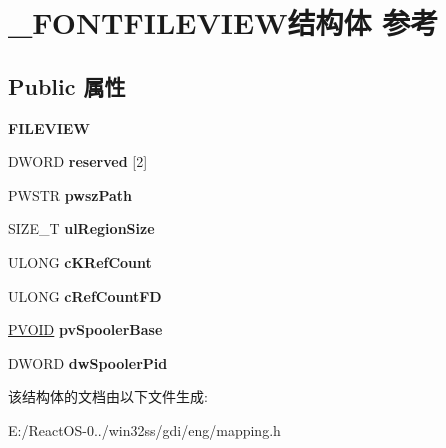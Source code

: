 \hypertarget{struct___f_o_n_t_f_i_l_e_v_i_e_w}{}\section{\+\_\+\+F\+O\+N\+T\+F\+I\+L\+E\+V\+I\+E\+W结构体 参考}
\label{struct___f_o_n_t_f_i_l_e_v_i_e_w}
\subsection*{Public 属性}
\begin{DoxyCompactItemize}
\item 
\mbox{\label{struct___f_o_n_t_f_i_l_e_v_i_e_w_ad887c3b9ffa9a83d175cf43e0cae3d38}} 
{\bfseries F\+I\+L\+E\+V\+I\+EW}
\item 
\mbox{\label{struct___f_o_n_t_f_i_l_e_v_i_e_w_a02647e338156eace40724987e3a966fb}} 
D\+W\+O\+RD {\bfseries reserved} \mbox{[}2\mbox{]}
\item 
\mbox{\label{struct___f_o_n_t_f_i_l_e_v_i_e_w_ae02b55d60b48e3272c632ef8c3736da6}} 
P\+W\+S\+TR {\bfseries pwsz\+Path}
\item 
\mbox{\label{struct___f_o_n_t_f_i_l_e_v_i_e_w_a1cdbf8f64906e40c144fb0ed8189d800}} 
S\+I\+Z\+E\+\_\+T {\bfseries ul\+Region\+Size}
\item 
\mbox{\label{struct___f_o_n_t_f_i_l_e_v_i_e_w_a231584a05c66c5edef9820f732067355}} 
U\+L\+O\+NG {\bfseries c\+K\+Ref\+Count}
\item 
\mbox{\label{struct___f_o_n_t_f_i_l_e_v_i_e_w_a591d8b76edde9c345e432a26a1eba4f6}} 
U\+L\+O\+NG {\bfseries c\+Ref\+Count\+FD}
\item 
\mbox{\label{struct___f_o_n_t_f_i_l_e_v_i_e_w_ab7991891baa20fb416280845e963f693}} 
\hyperlink{interfacevoid}{P\+V\+O\+ID} {\bfseries pv\+Spooler\+Base}
\item 
\mbox{\label{struct___f_o_n_t_f_i_l_e_v_i_e_w_a649cf1e7b7af0196cb703b5e320533d0}} 
D\+W\+O\+RD {\bfseries dw\+Spooler\+Pid}
\end{DoxyCompactItemize}


该结构体的文档由以下文件生成\+:\begin{DoxyCompactItemize}
\item 
E\+:/\+React\+O\+S-\/0../win32ss/gdi/eng/mapping.\+h\end{DoxyCompactItemize}
